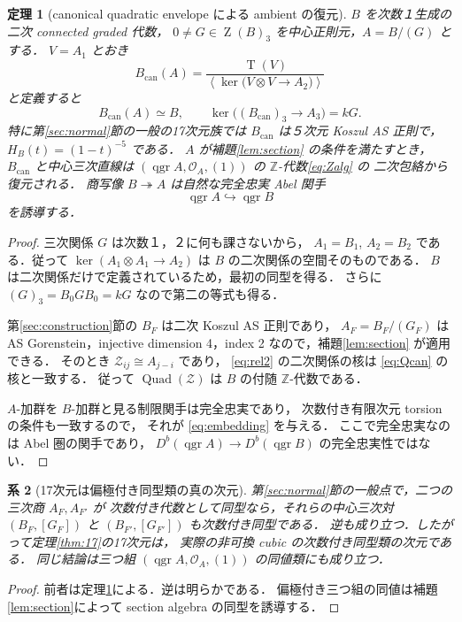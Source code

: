 \documentclass[11pt,a4paper]{ltjsarticle}
\numberwithin{equation}{section}
\newtheorem{theorem}{定理}[section]
\newtheorem{corollary}[theorem]{系}
\newcommand{\OO}{\mathcal O}
\newcommand{\cZ}{\mathcal Z}
\newcommand{\qgr}{\operatorname{qgr}}
\newcommand{\Z}{\operatorname{Z}}
\newcommand{\Tens}{\operatorname{T}}
\begin{document}
\begin{theorem}[canonical quadratic envelope による ambient の復元]\label{thm:ambient}
$B$ を次数１生成の二次 connected graded 代数，
$0\ne G\in\Z(B)_3$ を中心正則元，$A=B/(G)$ とする．
$V=A_1$ とおき
\begin{equation}\label{eq:Qcan}
 B_{\mathrm{can}}(A)=
 \frac{\Tens(V)}{\left\langle
 \ker\bigl(V\otimes V\longrightarrow A_2\bigr)
 \right\rangle}
\end{equation}
と定義すると
\begin{equation}\label{eq:recover}
 B_{\mathrm{can}}(A)\simeq B,
 \qquad
 \ker\bigl((B_{\mathrm{can}})_3\longrightarrow A_3\bigr)=kG.
\end{equation}
特に第\ref{sec:normal}節の一般の17次元族では
$B_{\mathrm{can}}$ は５次元 Koszul AS 正則で，
$H_B(t)=(1-t)^{-5}$ である．
$A$ が補題\ref{lem:section} の条件を満たすとき，
$B_{\mathrm{can}}$ と中心三次直線は
$(\qgr A,\OO_A,(1))$ の $\mathbb Z$-代数\eqref{eq:Zalg} の
二次包絡から復元される．
商写像 $B\twoheadrightarrow A$ は自然な完全忠実 Abel 関手
\begin{equation}\label{eq:embedding}
 \boxed{\qgr A\hookrightarrow\qgr B}
\end{equation}
を誘導する．
\end{theorem}
\begin{proof}
三次関係 $G$ は次数１，２に何も課さないから，
$A_1=B_1$, $A_2=B_2$ である．従って
$\ker(A_1\otimes A_1\to A_2)$ は $B$ の二次関係の空間そのものである．
$B$ は二次関係だけで定義されているため，最初の同型を得る．
さらに $(G)_3=B_0 G B_0=kG$ なので第二の等式も得る．

第\ref{sec:construction}節の $B_F$ は二次 Koszul AS 正則であり，
$A_F=B_F/(G_F)$ は AS Gorenstein，injective dimension 4，index 2
なので，補題\ref{lem:section} が適用できる．
そのとき $\cZ_{ij}\cong A_{j-i}$ であり，
\eqref{eq:rel2} の二次関係の核は \eqref{eq:Qcan} の核と一致する．
従って $\operatorname{Quad}(\cZ)$ は $B$ の付随 $\mathbb Z$-代数である．

$A$-加群を $B$-加群と見る制限関手は完全忠実であり，
次数付き有限次元 torsion の条件も一致するので，
それが \eqref{eq:embedding} を与える．
ここで完全忠実なのは Abel 圏の関手であり，
$D^b(\qgr A)\to D^b(\qgr B)$ の完全忠実性ではない．
\end{proof}

\begin{corollary}[17次元は偏極付き同型類の真の次元]\label{cor:17}
第\ref{sec:normal}節の一般点で，二つの三次商 $A_F,A_{F'}$ が
次数付き代数として同型なら，それらの中心三次対
$(B_F,[G_F])$ と $(B_{F'},[G_{F'}])$ も次数付き同型である．
逆も成り立つ．したがって定理\ref{thm:17}の17次元は，
実際の非可換 cubic の次数付き同型類の次元である．
同じ結論は三つ組 $(\qgr A,\OO_A,(1))$ の同値類にも成り立つ．
\end{corollary}
\begin{proof}
前者は定理\ref{thm:ambient}による．逆は明らかである．
偏極付き三つ組の同値は補題\ref{lem:section}によって
section algebra の同型を誘導する．
\end{proof}
\end{document}
